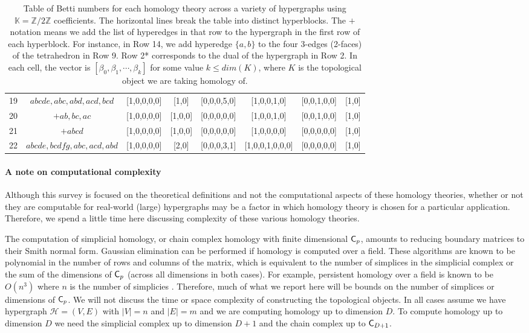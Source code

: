 \documentclass{amsart}
\newcommand{\K}{\mathbb{K}}
\newcommand{\Z}{\mathbb{Z}}
\newcommand{\Cgroup}        {\mm{\sf C}}
\renewcommand{\H}{\mathcal{H}}
\newcommand {\mm}[1]        {\ifmmode{#1}\else{\mbox{\(#1\)}}\fi}
\begin{document}
\begin{table}
{\begin{tabular}{c|c||cccc|cc}
\hline
19 & $abcde, abc, abd, acd, bcd$  & [1,0,0,0,0] & [1,0] & [0,0,0,5,0] & [1,0,0,1,0] & [0,0,1,0,0] & [1,0]\\
20 & $+ ab,bc,ac$     & [1,0,0,0,0] & [1,0,0] & [0,0,0,0,0] & [1,0,0,1,0] & [0,0,1,0,0] & [1,0]\\
21 & $+ abcd$          & [1,0,0,0,0] & [1,0,0] & [0,0,0,0,0] & [1,0,0,0,0] & [0,0,0,0,0] & [1,0]\\
\hline
22 & $abcde,bcdfg,abc,acd,abd$ & [1,0,0,0,0] & [2,0] & [0,0,0,3,1] & [1,0,0,1,0,0,0] & [0,0,0,0,0] & [1,0]\\
\end{tabular}
}
\caption{Table of Betti numbers for each homology theory across a variety of hypergraphs using $\K=\Z/2\Z$ coefficients. The horizontal lines break the table into distinct hyperblocks. The $+$ notation means we add the list of hyperedges in that row to the hypergraph in the first row of each hyperblock. For instance, in Row 14, we add hyperedge $\{a, b\}$ to the four 3-edges (2-faces) of the tetrahedron in Row 9. Row 2* corresponds to the dual of the hypergraph in Row 2. In each cell, the vector is $[\beta_0, \beta_1, \cdots, \beta_k]$ for some value $k \leq dim(K)$, where $K$ is the topological object we are taking homology of.}
\label{tab:intuition}
\end{table}

\paragraph{A note on computational complexity}
Although this survey is focused on the theoretical definitions and not the computational aspects of these homology theories, whether or not they are computable for real-world (large) hypergraphs may be a factor in which homology theory is chosen for a particular application. 
Therefore, we spend a little time here discussing complexity of these various homology theories.

The computation of simplicial homology, or chain complex homology with finite dimensional $\Cgroup_p$, amounts to reducing boundary matrices to their Smith normal form. Gaussian elimination can be performed if homology is computed over a field.
These algorithms are known to be polynomial in the number of rows and columns of the matrix, which is equivalent to the number of simplices in the simplicial complex or the sum of the dimensions of $\Cgroup_p$ (across all dimensions in both cases).
For example, persistent homology over a field is known to be $O(n^3)$ where $n$ is the number of simplicies \cite{edelsbrunner2000topological,zomorodian2005computing}.
Therefore, much of what we report here will be bounds on the number of simplices or dimensions of $\Cgroup_p$.
We will not discuss the time or space complexity of constructing the topological objects.
In all cases assume we have hypergraph $\H = (V, E)$ with $|V|=n$ and $|E|=m$ and we are computing homology up to dimension $D$. To compute homology up to dimension $D$ we need the simplicial complex up to dimension $D+1$ and the chain complex up to $\Cgroup_{D+1}$.
\end{document}
